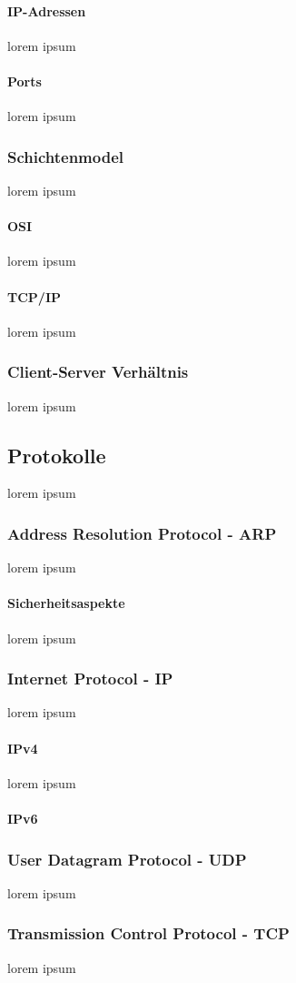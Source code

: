 \documentclass[10pt,a4paper]{report}
\begin{document}
\paragraph{IP-Adressen}
lorem ipsum
\paragraph{Ports}
lorem ipsum
\subsubsection{Schichtenmodel}
lorem ipsum
\paragraph{OSI}
lorem ipsum
\paragraph{TCP/IP}
lorem ipsum
\subsubsection{Client-Server Verhältnis}
lorem ipsum
\subsection{Protokolle}
lorem ipsum
\subsubsection{Address Resolution Protocol - ARP}
lorem ipsum
\paragraph{Sicherheitsaspekte}
lorem ipsum
\subsubsection{Internet Protocol - IP}
lorem ipsum
\paragraph{IPv4}
lorem ipsum
\paragraph{IPv6}
\subsubsection{User Datagram Protocol - UDP}
lorem ipsum
\subsubsection{Transmission Control Protocol - TCP}
lorem ipsum
\end{document}
